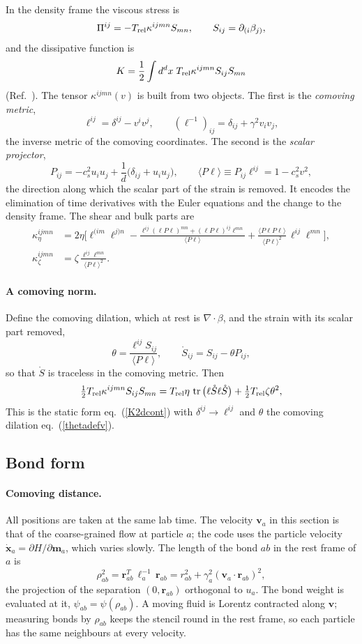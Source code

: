 \documentclass[11pt,aps,preprint,nofootinbib,superscriptaddress,tightenlines]{revtex4-2}
\def\st{\begin{equation}}
\def\stp{\end{equation}}
\def\Eq#1{eq.~(\ref{#1})}
\providecommand{\tr}{\operatorname{tr}}
\newcommand{\avg}[1]{\langle #1\rangle}
\let\oldparagraph\paragraph
\renewcommand{\paragraph}{\par\bigskip\oldparagraph}
\begin{document}
In the density frame the viscous stress is
\st
\Pi^{ij}=-T_{\rm rel}\kappa^{ijmn}S_{mn},\qquad S_{ij}=\partial_{(i}\beta_{j)},
\stp
and the dissipative function is
\st
K=\frac12\int d^dx\;T_{\rm rel}\kappa^{ijmn}S_{ij}S_{mn}
\label{Kv}
\stp
(Ref.~\cite{BhambureSinghTeaney2025}).  The tensor $\kappa^{ijmn}(v)$ is built
from two objects.  The first is the \emph{comoving metric},
\st
\ell^{ij}=\delta^{ij}-v^iv^j,\qquad (\ell^{-1})_{ij}=\delta_{ij}+\gamma^2v_iv_j ,
\stp
the inverse metric of the comoving coordinates.  The second is
the \emph{scalar projector},
\st
P_{ij}=-c_s^2u_iu_j+\frac1d\big(\delta_{ij}+u_iu_j\big),\qquad
\avg{P\ell}\equiv P_{ij}\ell^{ij}=1-c_s^2v^2 ,
\stp
the direction along which the scalar part of the strain is removed.  It
encodes the elimination of time derivatives with the Euler equations and the
change to the density frame.  The shear and bulk parts are
\begin{align}
\kappa_\eta^{ijmn}&=2\eta\Big[\ell^{(im}\ell^{j)n}
 -\frac{\ell^{ij}(\ell P\ell)^{mn}+(\ell P\ell)^{ij}\ell^{mn}}{\avg{P\ell}}
 +\frac{\avg{P\ell P\ell}}{\avg{P\ell}^2}\,\ell^{ij}\ell^{mn}\Big],\\
\kappa_\zeta^{ijmn}&=\zeta\,\frac{\ell^{ij}\ell^{mn}}{\avg{P\ell}^2} .
\end{align}

\paragraph{A comoving norm.}  Define the comoving dilation, which at rest is
$\nabla\!\cdot\!\beta$, and the strain with its scalar part removed,
\st
\theta=\frac{\ell^{ij}S_{ij}}{\avg{P\ell}},\qquad
\mathring S_{ij}=S_{ij}-\theta P_{ij} ,
\label{thetadefv}
\stp
so that $\mathring S$ is traceless in the comoving metric.  Then
\st
\tfrac12T_{\rm rel}\kappa^{ijmn}S_{ij}S_{mn}
=T_{\rm rel}\eta\,\tr\big(\ell\mathring S\ell\mathring S\big)+\tfrac12T_{\rm rel}\zeta\theta^2 ,
\label{normid}
\stp
This is the static form \Eq{K2dcont} with $\delta^{ij}\to\ell^{ij}$ and $\theta$
the comoving dilation \Eq{thetadefv}.

\subsection{Bond form}

\paragraph{Comoving distance.}  All positions are taken at the same lab time.
The velocity $\bm v_a$ in this section is that of the coarse-grained flow at
particle $a$; the code uses the particle velocity $\dot{\bm x}_a=\partial H/\partial\bm m_a$,
which varies slowly.  The length of the bond $ab$ in the rest frame of $a$ is
\st
\rho_{ab}^2=\bm r_{ab}^T\,\ell_a^{-1}\,\bm r_{ab}
=r_{ab}^2+\gamma_a^2(\bm v_a\!\cdot\bm r_{ab})^2 ,
\label{comovingdist}
\stp
the projection of the separation $(0,\bm r_{ab})$ orthogonal to $u_a$.  The bond
weight is evaluated at it, $\psi_{ab}=\psi(\rho_{ab})$.  A moving fluid is
Lorentz contracted along $\bm v$; measuring bonds by $\rho_{ab}$ keeps the
stencil round in the rest frame, so each particle has the same neighbours at
every velocity.
\end{document}

